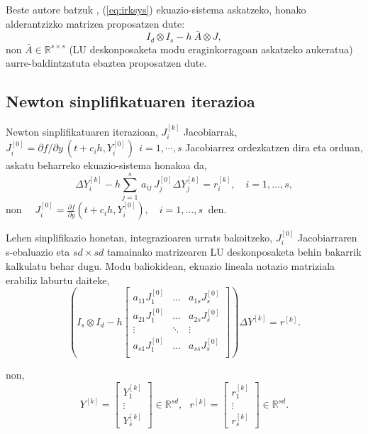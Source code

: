 Beste autore batzuk \cite{Brugnano2014,Jay2009}, (\ref{eq:irksys}) ekuazio-sistema askatzeko, honako alderantzizko matrizea proposatzen dute:
\begin{equation}
I_d \otimes I_s -h \ \bar{A} \otimes J,
\end{equation}
non $\bar{A} \in \mathbb{R}^{s \times s}$ (LU deskonposaketa modu eraginkorragoan askatzeko aukeratua) aurre-baldintzatuta ebaztea proposatzen dute. 


\subsection*{Newton sinplifikatuaren iterazioa}

Newton sinplifikatuaren iterazioan, $J_i^{[k]}$ Jacobiarrak,  $J_i^{[0]}=\partial f / \partial y \ (t+c_ih, Y_i^{[0]}) \ \ i=1,\cdots,s$ Jacobiarrez ordezkatzen dira eta orduan, askatu beharreko ekuazio-sistema honakoa da,
\begin{equation}
\label{eq:irks}
\Delta Y_{i}^{[k]}  - h \sum_{j=1}^{s}\, a_{ij}\, J_j^{[0]} \Delta Y_{j}^{[k]} = r_i^{[k]}, \quad  i=1 ,\ldots, s,
\end{equation}
non $\quad  J_i^{[0]}=\frac{\partial f}{\partial y}(t + c_i h,Y_{i}^{[0]}), \quad  i=1,\ldots,s \ $ den.

Lehen sinplifikazio honetan, integrazioaren urrats bakoitzeko,  $J_i^{[0]}$ Jacobiarraren s-ebaluazio eta $sd \times sd$ tamainako matrizearen LU deskonposaketa behin bakarrik kalkulatu behar dugu. Modu baliokidean, ekuazio lineala notazio matriziala erabiliz laburtu daiteke,
\begin{equation*}
\label{eq:805}
\left (I_s \otimes I_d - h  
\begin{bmatrix}
a_{11}  J_1^{[0]} & \dots & a_{1s}  J_s^{[0]} \\
a_{21}  J_1^{[0]} & \dots & a_{2s}  J_s^{[0]} \\
\vdots            & \ddots & \vdots \\
a_{s1}  J_1^{[0]} & \dots & a_{ss}  J_s^{[0]} \\ 
\end{bmatrix} \right) \Delta Y^{[k]} =r^{[k]}.
\end{equation*}

non,
\begin{equation*}
\label{eq:806}
Y^{[k]}=\begin{bmatrix}
Y_1^{[k]} \\
\vdots \\
Y_s^{[k]}
\end{bmatrix} \in \mathbb{R}^{sd}, \ \ \
r^{[k]}=\begin{bmatrix}
r_1^{[k]} \\
\vdots \\
r_s^{[k]}
\end{bmatrix} \in \mathbb{R}^{sd}.
\end{equation*}

